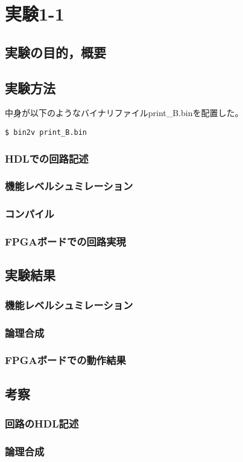 
\section{実験1-1}
\subsection{実験の目的，概要}

\subsection{実験方法}
中身が以下のようなバイナリファイルprint\_B.binを配置した。


\begin{lstlisting}[caption={イメージファイルの作成},label={イメージファイルの作成}]
  $ bin2v print_B.bin
\end{lstlisting}



\subsubsection{HDLでの回路記述}
\subsubsection{機能レベルシュミレーション}
\subsubsection{コンパイル}
\subsubsection{FPGAボードでの回路実現}

\subsection{実験結果}
\subsubsection{機能レベルシュミレーション}
\subsubsection{論理合成}
\subsubsection{FPGAボードでの動作結果}

\subsection{考察}
\subsubsection{回路のHDL記述}
\subsubsection{論理合成}
